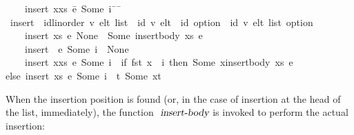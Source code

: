 \begin{isabelle}
~~~~{\isachardoublequoteopen}insert\ {\isacharparenleft}x{\isacharhash}xs{\isacharparenright}\ \=e\ {\isacharparenleft}Some\ i{\isacharparenright}\ \={\isacharequal}\ {\isacharparenleft}\=\kill
{}\ insert\ {\isacharcolon}{\isacharcolon}\ {\isachardoublequoteopen}{\isacharparenleft}{\isacharprime}id{\isacharcolon}{\isacharcolon}{\isacharbraceleft}linorder{\isacharbraceright}{\isacharcomma}\ {\isacharprime}v{\isacharparenright}\ elt\ list\ {\isasymRightarrow}\ {\isacharparenleft}{\isacharprime}id{\isacharcomma}\ {\isacharprime}v{\isacharparenright}\ elt\ {\isasymRightarrow}\ {\isacharprime}id\ option\ {\isasymRightarrow}\ {\isacharparenleft}{\isacharprime}id{\isacharcomma}\ {\isacharprime}v{\isacharparenright}\ elt\ list\ option{\isachardoublequoteclose}\ \\
~~~~{\isachardoublequoteopen}insert\ xs\ \>e\ None\ \>{\isacharequal}\ Some\ {\isacharparenleft}insert{\isacharunderscore}body\ xs\ e{\isacharparenright}{\isachardoublequoteclose}\ {\isacharbar}\\
~~~~{\isachardoublequoteopen}insert\ {\isacharbrackleft}{\isacharbrackright}\ \>e\ {\isacharparenleft}Some\ i{\isacharparenright}\ \>{\isacharequal}\ None{\isachardoublequoteclose}\ {\isacharbar}\\
~~~~{\isachardoublequoteopen}insert\ {\isacharparenleft}x{\isacharhash}xs{\isacharparenright}\ \>e\ {\isacharparenleft}Some\ i{\isacharparenright}\ \>{\isacharequal}\ {\isacharparenleft}\>if\ fst\ x\ {\isacharequal}\ i\ then\ Some\ {\isacharparenleft}x{\isacharhash}insert{\isacharunderscore}body\ xs\ e{\isacharparenright}\\
\>\>\>else\ insert\ xs\ e\ {\isacharparenleft}Some\ i{\isacharparenright}\ {\isasymbind}\ {\isacharparenleft}{\isasymlambda}t{\isachardot}\ Some\ {\isacharparenleft}x{\isacharhash}t{\isacharparenright}{\isacharparenright}{\isacharparenright}{\isachardoublequoteclose}
\end{isabelle}
When the insertion position is found (or, in the case of insertion at the head of the list, immediately), the function $\isa{insert-body}$ is invoked to perform the actual insertion:
